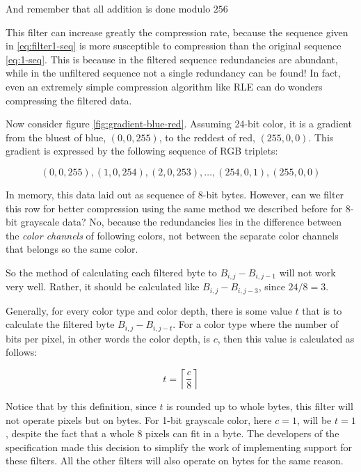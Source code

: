 And remember that all addition is done modulo $256$

This filter can increase greatly the compression rate, because the
sequence given in \ref{eq:filter1-seq} is more susceptible to
compression than the original sequence \ref{eq:1-seq}. This is because
in the filtered sequence redundancies are abundant, while in the
unfiltered sequence not a single redundancy can be found! In fact,
even an extremely simple compression algorithm like RLE can do wonders
compressing the filtered data.

Now consider figure \ref{fig:gradient-blue-red}. Assuming 24-bit
color, it is a gradient from the bluest of blue, $(0,0,255)$, to the
reddest of red, $(255,0,0)$. This gradient is expressed by the
following sequence of RGB triplets:

\begin{equation*}
  (0,0,255), (1,0,254), (2,0,253), \dots, (254,0,1), (255,0,0)
\end{equation*}

In memory, this data laid out as sequence of 8-bit bytes. However, can
we filter this row for better compression using the same method we
described before for 8-bit grayscale data? No, because the
redundancies lies in the difference between the \textit{color
  channels} of following colors, not between the separate color
channels that belongs so the same color.

So the method of calculating each filtered byte to $B_{i,j} -
B_{i,j-1}$ will not work very well. Rather, it should be calculated
like $B_{i,j} - B_{i,j-3}$, since $24 / 8 = 3$.

Generally, for every color type and color depth, there is some value $t$ that is to
calculate the filtered byte $B_{i,j} - B_{i,j-t}$. For a color type
where the number of bits per pixel, in other words the color depth, is
$c$, then this value is calculated as follows:

\begin{equation*}
  t = \left\lceil \frac{c}{8} \right\rceil
\end{equation*}

Notice that by this definition, since $t$ is rounded up to whole
bytes, this filter will not operate pixels but on bytes. For 1-bit
grayscale color, here $c=1$, will be $t=1$, despite the fact that a
whole $8$ pixels can fit in a byte. The developers of the \png
specification made this decision to simplify the work of implementing
support for these filters. All the other filters will also operate on
bytes for the same reason.


